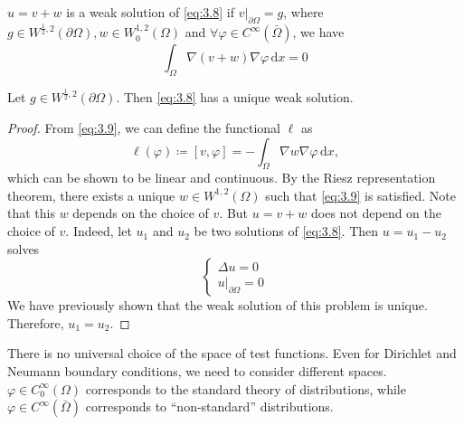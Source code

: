 \documentclass{report}
\begin{document}
\begin{definition}{}{}
    \(u = v + w\) is a weak solution of \ref{eq:3.8} if \(\left. v \right|_{\partial \Omega} = g\), where \(g \in W^{\frac{1}{2}, 2}(\partial \Omega), w \in W^{1, 2}_{0}(\Omega)\) and \(\forall \varphi \in C^{\infty}(\bar{\Omega})\), we have 
    \begin{equation}\label{eq:3.9}
        \int_{\Omega} \nabla (v+w) \nabla \varphi \,\mathrm{d}x = 0
    \end{equation}    
\end{definition}

\begin{theorem}{}{}
    Let \(g \in W^{\frac{1}{2}, 2}(\partial \Omega)\). Then \ref{eq:3.8} has a unique weak solution.
\end{theorem}

\begin{proof}
    From \ref{eq:3.9}, we can define the functional \(\ell\) as
    \[
        \ell(\varphi) \coloneqq [v, \varphi] =  - \int_{\Omega} \nabla w \nabla \varphi \,\mathrm{d}x,
    \]
    which can be shown to be linear and continuous. By the Riesz representation theorem, there exists a unique \(w \in W^{1, 2}(\Omega)\) such that \ref{eq:3.9} is satisfied. Note that this \(w\) depends on the choice of \(v\). But \(u = v + w\) does not depend on the choice of \(v\). Indeed, let \(u_1\) and \(u_2\) be two solutions of \ref{eq:3.8}. Then \(u = u_1 - u_2\) solves
    \[
        \begin{cases}
            \Delta u = 0 \\
            \left. u \right|_{\partial \Omega} = 0
        \end{cases}
    \]
    We have previously shown that the weak solution of this problem is unique. Therefore, \(u_1 = u_2\). 
\end{proof}

\begin{note}
    There is no universal choice of the space of test functions. Even for Dirichlet and Neumann boundary conditions, we need to consider different spaces. \(\varphi \in C^{\infty}_{0}(\Omega)\) corresponds to the standard theory of distributions, while \(\varphi \in C^{\infty}(\bar{\Omega})\) corresponds to ``non-standard'' distributions.
\end{note}
\end{document}
